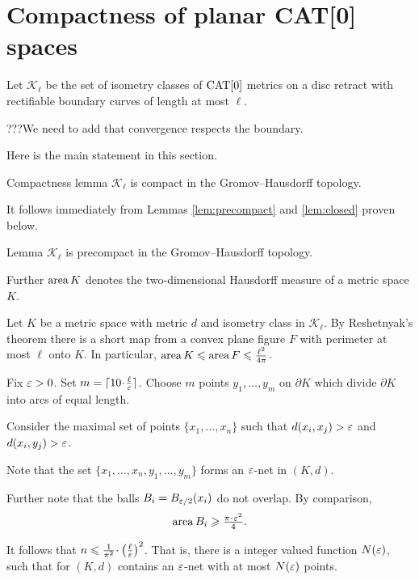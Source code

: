 \documentclass{article}
\begin{document}
\section{Compactness of planar CAT[0] spaces}\label{Compactness}

Let $\mathcal{K}_\ell$ be the set of isometry classes of $\mathop{\rm CAT}\nolimits[0]$ metrics on a disc retract with rectifiable
boundary curves of length at most $\ell$.

???We need to add that convergence respects the boundary.


Here is the main statement in this section.

\begin{thm}{Compactness lemma}\label{lem:compact}
$\mathcal{K}_\ell$ is compact in the Gromov--Hausdorff topology.
\end{thm}

It follows immediately from Lemmas \ref{lem:precompact} and \ref{lem:closed} proven below.

\begin{thm}{Lemma}\label{lem:precompact}
$\mathcal{K}_\ell$ is precompact in the Gromov--Hausdorff topology.
\end{thm}

Further $\mathop{\rm area}\nolimits K$ denotes the two-dimensional Hausdorff measure of a metric space $K$. 

Let $K$ be a metric space with metric $d$ and isometry class in $\mathcal {K}_\ell$.
By Reshetnyak's theorem there is a short map from a convex plane figure $F$ with perimeter at most $\ell$ onto $K$.
In particular, $\mathop{\rm area}\nolimits K \leqslant \mathop{\rm area}\nolimits F \leqslant \tfrac{\ell^2}{4\pi}$.

Fix $\varepsilon>0$. 
Set $m=\lceil 10\cdot\tfrac\ell\eps\rceil$.
Choose $m$ points $y_1,\dots,y_m$ on $\partial K$
which divide $\partial K$ into arcs of equal length.

Consider the maximal set of points $\{x_1,\dots,x_n\}$ such that $d(x_i,x_j)>\varepsilon$ and $d(x_i,y_j)>\varepsilon$.

Note that the set $\{x_1,\dots,x_n,y_1,\dots,y_m\}$
forms an $\varepsilon$-net in $(K,d)$.

Further note that the balls $B_i=B_{\varepsilon/2}(x_i)$
do not overlap.
By comparison,
\[\area B_i\ge \tfrac{\pi\cdot\eps^2}{4}.\]

It follows that $n\le \tfrac{1}{\pi^2}\cdot\left(\tfrac\ell\eps\right)^2$.
That is, there is a integer valued function $N(\varepsilon)$,
such that for  
$(K,d)$ contains an $\varepsilon$-net
with at most $N(\varepsilon)$ points.
\end{document}
